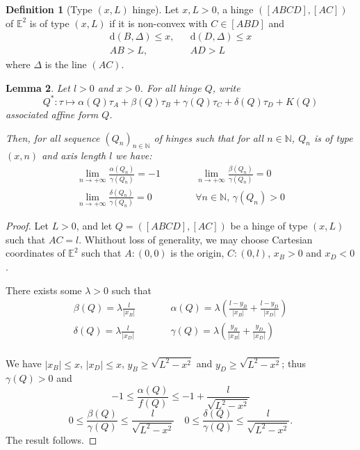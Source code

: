 \documentclass[a4paper,12pt]{article}
\def\NN{\mathbb N}
\def\E{\mathbf E}
\def\d{\mathrm{d}}
\def\E{\mathbb{E}}
\def\E{\mathbb{E}}
\def\d{\mathrm{d}}
\newtheorem{lem}{Lemma}[section]		 %
\theoremstyle{definition}
\newtheorem{defi}[lem]{Definition}	%
\begin{document}
				\begin{defi}[Type $(x,L)$ hinge]\label{defi:charniere_type}
					Let $x,L>0$, a hinge $([ABCD],[AC])$ of $\E^2$ is of type $(x,L)$ if it is non-convex with $C\in [ABD]$
					and \begin{eqnarray*}
					 \d(B,\Delta)\leq x,&& \d(D,\Delta)\leq x\\
							AB>L,&& AD>L
					 \end{eqnarray*}
					 where $\Delta$ is the line $(AC)$.
				\end{defi}

				\begin{lem}\label{lem:charniere_type_rel} Let $l>0$ and $x>0$.
				For all hinge $Q$, write
				$$Q^*:\tau \mapsto \alpha(Q)\tau_A+\beta(Q)\tau_B+\gamma(Q)\tau_C+\delta(Q)\tau_D+K(Q)$$
				associated affine form $Q$.

				Then, for all sequence $(Q_n)_{n\in \NN}$ of hinges
				such that for all $n\in \NN$, $Q_n$ is of type $(x,n)$ and axis length $l$ we have:
				\begin{eqnarray*}
				 \lim_{n\rightarrow +\infty} \frac{\alpha(Q_n)}{\gamma(Q_n)}= -1&\quad\quad&\displaystyle
				 \lim_{n\rightarrow +\infty} \frac{\beta(Q_n)}{\gamma(Q_n)}= 0\\
				 \lim_{n\rightarrow +\infty} \frac{\delta(Q_n)}{\gamma(Q_n)}= 0&&\forall n\in\NN,\,\gamma(Q_n)>0
				\end{eqnarray*}
				\end{lem}
				\begin{proof} Let $L>0$,
				and let $Q=([ABCD],[AC])$ be a hinge of type $(x,L)$ such that $AC=l$.
				 Whithout loss of generality, we may choose Cartesian coordinates of $\E^2$ such that $A:(0,0)$ is the origin,
				 $C:(0,l)$, $x_B>0$ and $x_D<0$.

				 There exists some $\lambda>0$ such that
				 \begin{eqnarray*}
					\beta(Q)=\lambda\frac{l}{|x_B|}&\quad\quad& \alpha(Q)=\lambda\left(\frac{l-y_B}{|x_B|}+\frac{l-y_D}{|x_D|} \right)\\
					\delta(Q) = \lambda\frac{l}{|x_D|} &\quad\quad & \gamma(Q)=\lambda\left(\frac{y_B}{|x_B|}+\frac{y_D}{|x_D|}\right) \\
				 \end{eqnarray*}

				We have $|x_B|\leq x$, $|x_D|\leq x$, $y_B\geq \sqrt{L^2-x^2}$ and $y_D\geq \sqrt{L^2-x^2}$;
				 thus $\gamma(Q)>0$ and $$ -1\leq\frac{\alpha(Q)}{f(Q)}\leq -1+ \frac{l}{\sqrt{L^2-x^2}}$$
				 $$ 0\leq\frac{\beta(Q)}{\gamma(Q)}\leq \frac{l}{\sqrt{L^2-x^2}} \quad 0\leq\frac{\delta(Q)}{\gamma(Q)}\leq \frac{l}{\sqrt{L^2-x^2}}.$$
				The result follows.
				\end{proof}
\end{document}

